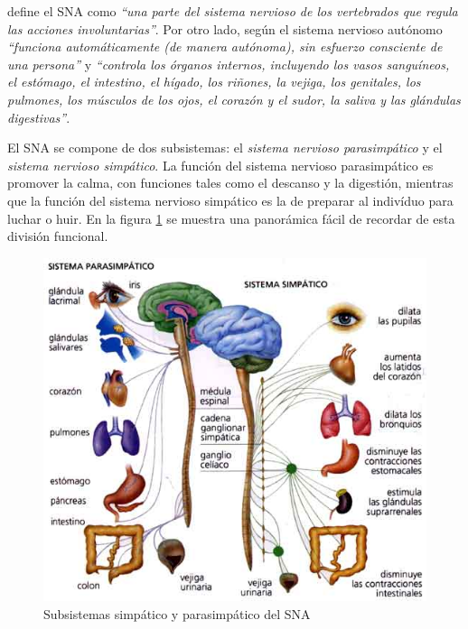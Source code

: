\cite{Lindberg.} define el SNA como {\it ``una parte del sistema nervioso de los vertebrados que regula las acciones involuntarias''}. Por otro lado, según \cite{MerckCo.} el sistema nervioso autónomo {\it ``funciona automáticamente (de manera autónoma), sin esfuerzo consciente de una persona''} y {\it ``controla los órganos internos, incluyendo los vasos sanguíneos, el estómago, el intestino, el hígado, los riñones, la vejiga, los genitales, los pulmones, los músculos de los ojos, el corazón y el sudor, la saliva y las glándulas digestivas''}.

El \acs{SNA} se compone de dos subsistemas: el {\it sistema nervioso parasimpático} y el {\it sistema nervioso simpático}. La función del sistema nervioso parasimpático es promover la calma, con funciones tales como el descanso y la digestión, mientras que la función del sistema nervioso simpático es la de preparar al indivíduo para luchar o huir. En la figura \ref{fig:sna} se muestra una panorámica fácil de recordar de esta división funcional.

\begin{figure}[h]
  \begin{center}
    \includegraphics[scale=0.7]{images/sna.jpg}
    \caption{Subsistemas simpático y parasimpático del SNA}
    \label{fig:sna}
  \end{center}
\end{figure}


